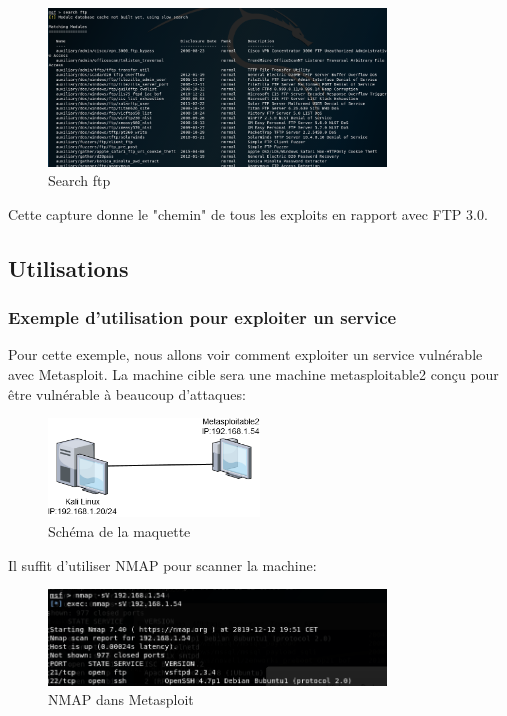 \begin{figure}[htp!]
  \centering
  \setlength\figureheight{7cm}
  \setlength\figurewidth{9cm}
  \includegraphics[width=0.8\textwidth]{oui/Ancien/imangeancien/metasploit/search.PNG}
  \caption{Search ftp}
  \label{fig:courbe-tikz}
\end{figure}

Cette capture donne le "chemin" de tous les exploits en rapport avec FTP 3.0.

\subsection{Utilisations}

\subsubsection{Exemple d'utilisation pour exploiter un service}

Pour cette exemple, nous allons voir comment exploiter un service vulnérable avec Metasploit. La machine cible sera une machine metasploitable2 conçu pour être vulnérable à beaucoup d'attaques:

\begin{figure}[htp!]
  \centering
  \setlength\figureheight{7cm}
  \setlength\figurewidth{9cm}
  \includegraphics[width=0.5\textwidth]{oui/Ancien/imangeancien/metasploit/schema.png}
  \caption{Schéma de la maquette}
  \label{fig:courbe-tikz}
\end{figure}

\newpage

Il suffit d'utiliser NMAP pour scanner la machine:
\begin{figure}[htp!]
  \centering
  \setlength\figureheight{7cm}
  \setlength\figurewidth{9cm}
  \includegraphics[width=0.8\textwidth]{oui/Ancien/imangeancien/metasploit/nmap.PNG}
  \caption{NMAP dans Metasploit}
  \label{fig:courbe-tikz}
\end{figure}

